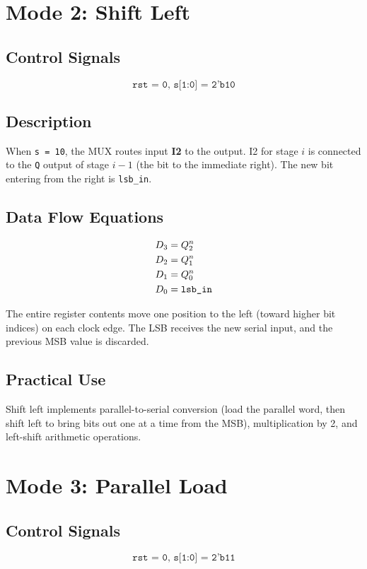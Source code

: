 \documentclass[12pt,a4paper]{report}
\newcommand{\signal}[1]{\texttt{\textcolor{codeblue}{#1}}}
\begin{document}
\section{Mode 2: Shift Left}

\subsection{Control Signals}
\[\texttt{rst = 0, s[1:0] = 2'b10}\]

\subsection{Description}
When \signal{s = 10}, the MUX routes input \textbf{I2} to the output. I2 for stage $i$ is connected to the \signal{Q} output of stage $i-1$ (the bit to the immediate right). The new bit entering from the right is \signal{lsb\_in}.

\subsection{Data Flow Equations}
\begin{align}
    D_3 &= Q_2^n \notag \\
    D_2 &= Q_1^n \notag \\
    D_1 &= Q_0^n \notag \\
    D_0 &= \texttt{lsb\_in} \notag
\end{align}

The entire register contents move one position to the left (toward higher bit indices) on each clock edge. The LSB receives the new serial input, and the previous MSB value is discarded.

\subsection{Practical Use}
Shift left implements parallel-to-serial conversion (load the parallel word, then shift left to bring bits out one at a time from the MSB), multiplication by 2, and left-shift arithmetic operations.

\section{Mode 3: Parallel Load}

\subsection{Control Signals}
\[\texttt{rst = 0, s[1:0] = 2'b11}\]
\end{document}
